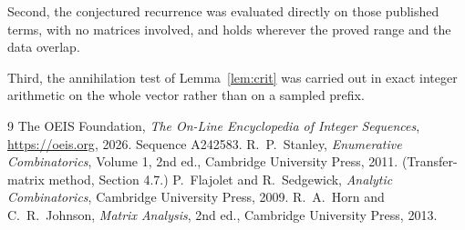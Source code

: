 \documentclass[11pt,a4paper]{article}
\theoremstyle{plain}
\theoremstyle{definition}
\begin{document}
Second, the conjectured recurrence was evaluated directly on those published terms, with no
matrices involved, and holds wherever the proved range and the data overlap.

Third, the annihilation test of Lemma~\ref{lem:crit} was carried out in exact integer
arithmetic on the whole vector rather than on a sampled prefix.

\begin{thebibliography}{9}
 The OEIS Foundation, \emph{The On-Line Encyclopedia of Integer
Sequences}, \url{https://oeis.org}, 2026. Sequence A242583.
 R.~P.~Stanley, \emph{Enumerative Combinatorics}, Volume 1, 2nd ed.,
Cambridge University Press, 2011. (Transfer-matrix method, Section 4.7.)
 P.~Flajolet and R.~Sedgewick, \emph{Analytic Combinatorics}, Cambridge
University Press, 2009.
 R.~A.~Horn and C.~R.~Johnson, \emph{Matrix Analysis}, 2nd ed., Cambridge
University Press, 2013.
\end{thebibliography}
\end{document}
